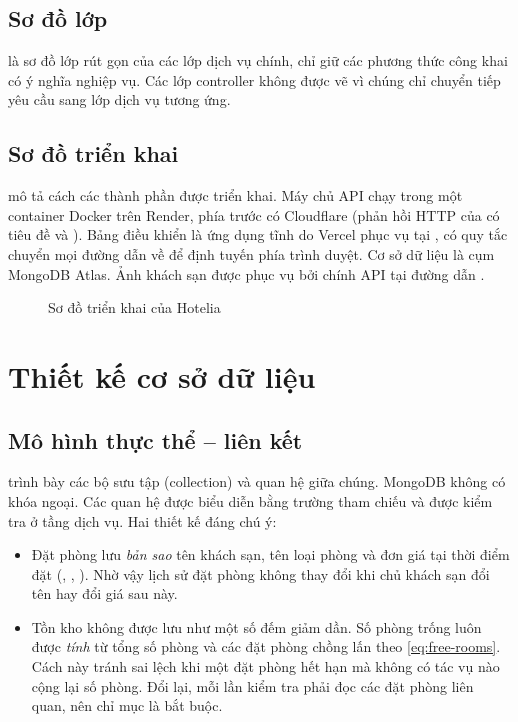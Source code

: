 
\subsection{Sơ đồ lớp}

 là sơ đồ lớp rút gọn của các lớp dịch vụ chính, chỉ giữ các phương thức công khai có ý nghĩa nghiệp vụ. Các lớp controller không được vẽ vì chúng chỉ chuyển tiếp yêu cầu sang lớp dịch vụ tương ứng.


\subsection{Sơ đồ triển khai}\label{sec:deploy-design}

 mô tả cách các thành phần được triển khai. Máy chủ API chạy trong một container Docker trên Render, phía trước có Cloudflare (phản hồi HTTP của  có tiêu đề  và ). Bảng điều khiển là ứng dụng tĩnh do Vercel phục vụ tại , có quy tắc chuyển mọi đường dẫn về  để định tuyến phía trình duyệt. Cơ sở dữ liệu là cụm MongoDB Atlas. Ảnh khách sạn được phục vụ bởi chính API tại đường dẫn .

\begin{figure}[H]
\centering
{}
\caption{Sơ đồ triển khai của Hotelia}\label{fig:deployment}
\end{figure}

\section{Thiết kế cơ sở dữ liệu}\label{sec:db-design}

\subsection{Mô hình thực thể -- liên kết}

 trình bày các bộ sưu tập (collection) và quan hệ giữa chúng. MongoDB không có khóa ngoại. Các quan hệ được biểu diễn bằng trường  tham chiếu và được kiểm tra ở tầng dịch vụ. Hai thiết kế đáng chú ý:
\begin{itemize}
\item Đặt phòng lưu \emph{bản sao} tên khách sạn, tên loại phòng và đơn giá tại thời điểm đặt (, , ). Nhờ vậy lịch sử đặt phòng không thay đổi khi chủ khách sạn đổi tên hay đổi giá sau này.
\item Tồn kho không được lưu như một số đếm giảm dần. Số phòng trống luôn được \emph{tính} từ tổng số phòng và các đặt phòng chồng lấn theo \cref{eq:free-rooms}. Cách này tránh sai lệch khi một đặt phòng hết hạn mà không có tác vụ nào cộng lại số phòng. Đổi lại, mỗi lần kiểm tra phải đọc các đặt phòng liên quan, nên chỉ mục  là bắt buộc.
\end{itemize}

